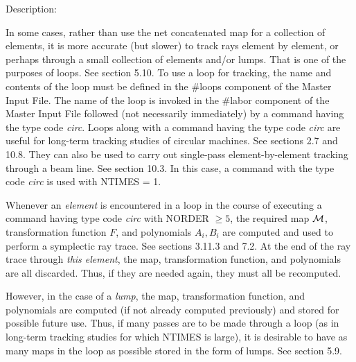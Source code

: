 \vspace{5mm}
     Description:
\vspace{2mm}

In some cases, rather than use the net concatenated map for a collection
of elements, it is more accurate (but slower) to track rays element by
element, or perhaps through a small collection of elements and/or lumps.
That is one of the purposes of loops.  See section 5.10.  To use a loop
for tracking, the name and contents of the loop must be defined in the
\#loops component of the Master Input File.  The name of the loop is
invoked in the \#labor component of the Master Input File followed (not
necessarily immediately) by a command having the type code {\em circ}.
Loops along with a command having the type code {\em circ} are useful for
long-term tracking studies of circular machines.  See sections 2.7 and 10.8.  They
can also be used to carry out single-pass element-by-element tracking
through a beam line.  See section 10.3.  In this case, a command with the type code {\em
circ} is used with NTIMES = 1.

Whenever an {\em element} is encountered in a loop in the course of executing
a command having type code {\em circ} with NORDER $\geq 5$, the required
map ${\cal M}$, transformation function $F$, and polynomials $A_i, B_i$ are
computed and used to perform a symplectic ray trace.  See sections 3.11.3
and 7.2.  At the end of the ray trace through {\em this element}, the
map, transformation function, and polynomials are all discarded.  Thus,
if they are needed again, they must all be recomputed.

However, in the case of a {\em lump}, the map, transformation function,
and polynomials are computed (if not already computed previously) and
stored for possible future use.  Thus, if many passes are to be made
through a loop (as in long-term tracking studies for which NTIMES is
large), it is desirable to have as many maps in the loop as possible
stored in the form of lumps.  See section 5.9.

\newpage
